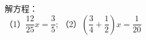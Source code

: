 解方程：\\
（1）$\dfrac{12}{25}x=\dfrac{3}{5}$;\hspace{4cm}
（2）$\left(\dfrac{3}{4}+\dfrac{1}{2}\right)x=\dfrac{1}{20}$